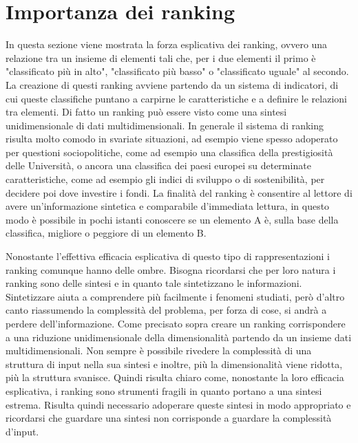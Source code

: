 \documentclass{report}
\begin{document}




\newpage
\chapter{Importanza dei ranking}
In questa sezione viene mostrata la forza esplicativa dei ranking, ovvero una relazione tra un insieme di elementi tali che, per i due elementi il primo è "classificato più in alto", "classificato più basso" o "classificato uguale" al secondo. La creazione di questi ranking avviene partendo da un sistema di indicatori, di cui queste classifiche puntano a carpirne le caratteristiche e a definire le relazioni tra elementi. Di fatto un ranking può essere visto come una sintesi unidimensionale di dati multidimensionali. 
In generale il sistema di ranking risulta molto comodo in svariate situazioni, ad esempio viene spesso adoperato per questioni sociopolitiche, come ad esempio una classifica della prestigiosità delle Università, o ancora una classifica dei paesi europei su determinate caratteristiche, come ad esempio gli indici di sviluppo o di sostenibilità, per decidere poi dove investire i fondi. La finalità del ranking è consentire al lettore di avere un'informazione sintetica e comparabile d'immediata lettura, in questo modo è possibile in pochi istanti conoscere se un elemento A è, sulla base della classifica, migliore o peggiore di un elemento B.


Nonostante l'effettiva efficacia esplicativa di questo tipo di rappresentazioni i ranking comunque hanno delle ombre. Bisogna ricordarsi che per loro natura i ranking sono delle sintesi e in quanto tale sintetizzano le informazioni. Sintetizzare aiuta a comprendere più facilmente i fenomeni studiati, però d'altro canto riassumendo la complessità del problema, per forza di cose, si andrà a perdere dell'informazione. Come precisato sopra creare un ranking corrispondere a una riduzione unidimensionale della dimensionalità partendo da un insieme dati multidimensionali. Non sempre è possibile rivedere la complessità di una struttura di input nella sua sintesi e inoltre, più la dimensionalità viene ridotta, più la struttura svanisce. Quindi risulta chiaro come, nonostante la loro efficacia esplicativa, i ranking sono strumenti fragili in quanto portano a una sintesi estrema. Risulta quindi necessario adoperare queste sintesi in modo appropriato e ricordarsi che guardare una sintesi non corrisponde a guardare la complessità d'input.
\end{document}
